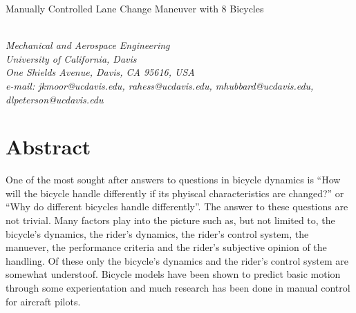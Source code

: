 \documentclass{bmd2010a}
\begin{document}
\begin{flushleft}
{\fontsize{16pt}{20pt}\selectfont%
  Manually Controlled Lane Change Maneuver with 8 Bicycles\\}
\end{flushleft}

\begin{flushleft}
  {\\}
  \textit{Mechanical and Aerospace Engineering\\
          University of California, Davis\\
          One Shields Avenue, Davis, CA 95616, USA\\
          e-mail: jkmoor@ucdavis.edu, rahess@ucdavis.edu, mhubbard@ucdavis.edu,
          dlpeterson@ucdavis.edu
  }\vspace{10pt}\\
\end{flushleft}

\section*{Abstract}

One of the most sought after answers to questions in bicycle dynamics is ``How
will the bicycle handle differently if its phyiscal characteristics are
changed?'' or ``Why do different bicycles handle differently''. The answer to
these questions are not trivial. Many factors play into the picture such as,
but not limited to, the bicycle's dynamics, the rider's dynamics, the rider's
control system, the manuever, the performance criteria and the rider's
subjective opinion of the handling. Of these only the bicycle's dynamics and
the rider's control system are somewhat understoof. Bicycle models have been
shown to predict basic motion through some experientation and much research has
been done in manual control for aircraft pilots.
\end{document}
